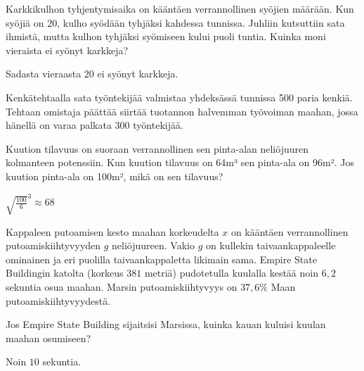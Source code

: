 \begin{tehtavasivu}
\begin{tehtava}
	Karkkikulhon tyhjentymisaika on kääntäen verrannollinen syöjien määrään. Kun syöjiä on 20, kulho syödään tyhjäksi kahdessa tunnissa. Juhliin kutsuttiin sata ihmistä, mutta kulhon tyhjäksi syömiseen kului puoli tuntia. Kuinka moni vieraista ei syönyt karkkeja?
	\begin{vastaus}
		Sadasta vieraasta 20 ei syönyt karkkeja.
	\end{vastaus}
\end{tehtava}

\begin{tehtava}
Kenkätehtaalla sata työntekijää valmistaa yhdeksässä tunnissa 500 paria kenkiä. Tehtaan omistaja päättää siirtää tuotannon halvemman työvoiman maahan, jossa hänellä on varaa palkata 300 työntekijää. 

\begin{alakohdat}
\end{alakohdat} 
\begin{vastaus}
\begin{alakohdat}
\end{alakohdat} 
\end{vastaus}
\end{tehtava}

\begin{tehtava}
	Kuution tilavuus on suoraan verrannollinen sen pinta-alan neliöjuuren kolmanteen potenssiin. Kun kuution tilavuus on 64m³ sen pinta-ala on 96m². Jos kuution pinta-ala on 100m², mikä on sen tilavuus?
	\begin{vastaus}
		${\sqrt{\frac{100}{6}}}^{3} \approx 68$
	\end{vastaus}
\end{tehtava}

\begin{tehtava}
Kappaleen putoamisen kesto maahan korkeudelta $x$ on kääntäen verrannollinen putoamiskiihtyvyyden $g$ neliöjuureen. Vakio $g$ on kullekin taivaankappaleelle ominainen ja eri puolilla taivaankappaletta likimain sama. Empire State Buildingin katolta (korkeus $381$ metriä) pudotetulla kuulalla kestää noin $6,2$ sekuntia osua maahan. Marsin putoamiskiihtyvyys on $37,6\%$ Maan putoamiskiihtyvyydestä. 

Jos Empire State Building sijaitsisi Marsissa, kuinka kauan kuluisi kuulan maahan osumiseen?
    \begin{vastaus}
        Noin $10$ sekuntia.
    \end{vastaus}
\end{tehtava}

\end{tehtavasivu}
